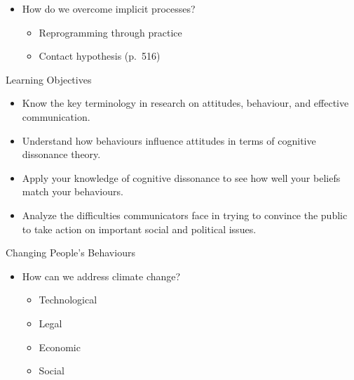 \documentclass[
]{book}
\providecommand{\tightlist}{%
  \setlength{\itemsep}{0pt}\setlength{\parskip}{0pt}}
\begin{document}
\begin{reflect}
\begin{itemize}
\tightlist
\item
  How do we overcome implicit processes?

  \begin{itemize}
  \tightlist
  \item
    Reprogramming through practice\\
  \item
    Contact hypothesis (p.~516)
  \end{itemize}
\end{itemize}

Learning Objectives

\begin{itemize}
\tightlist
\item
  Know the key terminology in research on attitudes, behaviour, and effective communication.\\
\item
  Understand how behaviours influence attitudes in terms of cognitive dissonance theory.\\
\item
  Apply your knowledge of cognitive dissonance to see how well your beliefs match your behaviours.\\
\item
  Analyze the difficulties communicators face in trying to convince the public to take action on important social and political issues.
\end{itemize}

Changing People's Behaviours

\begin{itemize}
\tightlist
\item
  How can we address climate change?

  \begin{itemize}
  \tightlist
  \item
    Technological\\
  \item
    Legal\\
  \item
    Economic\\
  \item
    Social
  \end{itemize}
\end{itemize}


\end{reflect}
\end{document}
